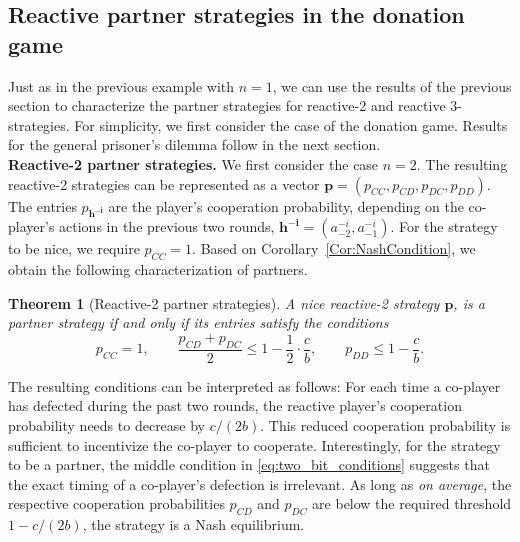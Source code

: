 \documentclass[11pt]{article}
\theoremstyle{plainCl1}
\newtheorem{theorem}{Theorem}
\theoremstyle{plainCl2}
\begin{document}

\subsection{Reactive partner strategies in the donation game}\label{section:reactive_strategies}

Just as in the previous example with $n\!=\!1$, we can use the results of the previous section to characterize the partner strategies for reactive-2 and reactive 3-strategies. 
For simplicity, we first consider the case of the donation game. Results for the general prisoner's dilemma follow in the next section.\\ 

\noindent
{\bf Reactive-2 partner strategies.}
We first consider the case $n\!=\!2$. 
The resulting reactive-2 strategies can be represented as a vector
$\mathbf{p}=(p_{CC}, p_{CD}, p_{DC}, p_{DD})$. 
The entries $p_\mathbf{h^{-i}}$ are the player's cooperation probability, depending on the co-player's actions in the previous two rounds, $\mathbf{h^{-i}}\!=\!(a^{-i}_{-2},a^{-i}_{-1})$. 
For the strategy to be nice, we require $p_{CC}\!=\!1$. 
Based on Corollary~\ref{Cor:NashCondition}, we obtain the following characterization of partners. 

\begin{theorem}[Reactive-2 partner strategies]\label{theorem:reactive_two_partner_strategies}
A nice reactive-2 strategy $\mathbf{p}$, is a partner strategy if and only if its entries satisfy the conditions
\begin{equation}\label{eq:two_bit_conditions}
  p_{CC} \!=\! 1, \qquad \displaystyle \frac{p_{CD} \!+\! p_{DC}}{2} \!\le\! 1 \!-\! \frac{1}{2} \cdot \frac{c}{b}, \qquad p_{DD} \le 1\!-\! \frac{c}{b}.
\end{equation}
\end{theorem}

\noindent
The resulting conditions can be interpreted as follows: For each time a co-player has defected during the past two rounds, the reactive player's cooperation probability needs to decrease by $c/(2b)$. 
This reduced cooperation probability is sufficient to incentivize the co-player to cooperate. 
Interestingly, for the strategy to be a partner, the middle condition in \eqref{eq:two_bit_conditions} suggests that the exact timing of a co-player's defection is irrelevant. 
As long as {\it on average}, the respective cooperation probabilities $p_{CD}$ and $p_{DC}$ are below the required threshold $1\!-\!c/(2b)$, the strategy is a Nash equilibrium. 
\end{document}
